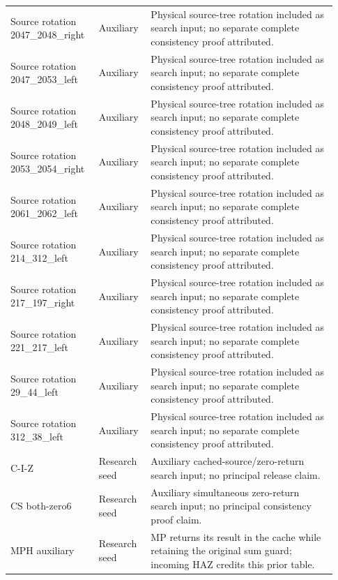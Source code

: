 \begin{longtable}{@{}p{0.25\linewidth}p{0.14\linewidth}p{0.54\linewidth}@{}}
Source rotation 2047\_\allowbreak{}2048\_\allowbreak{}right & Auxiliary & Physical source-tree rotation included as search input; no separate complete consistency proof attributed. \\
Source rotation 2047\_\allowbreak{}2053\_\allowbreak{}left & Auxiliary & Physical source-tree rotation included as search input; no separate complete consistency proof attributed. \\
Source rotation 2048\_\allowbreak{}2049\_\allowbreak{}left & Auxiliary & Physical source-tree rotation included as search input; no separate complete consistency proof attributed. \\
Source rotation 2053\_\allowbreak{}2054\_\allowbreak{}right & Auxiliary & Physical source-tree rotation included as search input; no separate complete consistency proof attributed. \\
Source rotation 2061\_\allowbreak{}2062\_\allowbreak{}left & Auxiliary & Physical source-tree rotation included as search input; no separate complete consistency proof attributed. \\
Source rotation 214\_\allowbreak{}312\_\allowbreak{}left & Auxiliary & Physical source-tree rotation included as search input; no separate complete consistency proof attributed. \\
Source rotation 217\_\allowbreak{}197\_\allowbreak{}right & Auxiliary & Physical source-tree rotation included as search input; no separate complete consistency proof attributed. \\
Source rotation 221\_\allowbreak{}217\_\allowbreak{}left & Auxiliary & Physical source-tree rotation included as search input; no separate complete consistency proof attributed. \\
Source rotation 29\_\allowbreak{}44\_\allowbreak{}left & Auxiliary & Physical source-tree rotation included as search input; no separate complete consistency proof attributed. \\
Source rotation 312\_\allowbreak{}38\_\allowbreak{}left & Auxiliary & Physical source-tree rotation included as search input; no separate complete consistency proof attributed. \\
C-\allowbreak{}I-\allowbreak{}Z & Research seed & Auxiliary cached-source/zero-return search input; no principal release claim. \\
CS both-\allowbreak{}zero6 & Research seed & Auxiliary simultaneous zero-return search input; no principal consistency proof claim. \\
MPH auxiliary & Research seed & MP returns its result in the cache while retaining the original sum guard; incoming HAZ credits this prior table. \\

\end{longtable}
